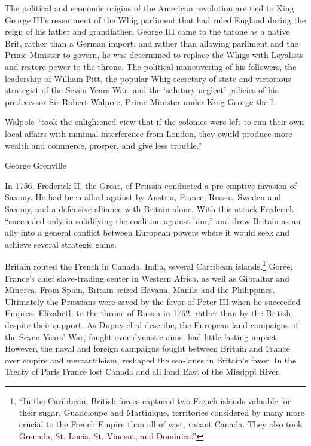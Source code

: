 The political and economic origins of the American revolution are tied to King
George III's resentment of the Whig parliment that had ruled England during the
reign of his father and grandfather. George III came to the throne as a native
Brit, rather than a German import, and rather than allowing parliment and the
Prime Minister to govern, he was determined to replace the Whigs with Loyalists
and restore power to the throne. The political maneuvering of his followers,
the leadership of William Pitt, the popular Whig secretary of state and
victorious strategist of the Seven Years War, and the `salutary
neglect'  policies of his predecessor Sir Robert Walpole, Prime Minister under
King George the I.\cite[Ch 1-4]{cook_long_1995}

Walpole ``took the enlightened view that if the colonies were left to run their
own local affairs with minimal interference from London, they owuld produce more
wealth and commerce, prosper, and give less trouble.''\cite[p. 3]{cook_long_1995}

George Grenville


In 1756, Frederick II, the Great, of Prussia conducted a pre-emptive invasion 
of Saxony. He had been allied against by Austria, France, Russia, Sweden and
Saxony, and a defensive alliance with Britain alone. With this attack Frederick
``succeeded only in solidifying the coalition against
him,''\cite{dupuy_1977} and drew Britain as an ally into a general conflict
between European powers where it would seek and achieve several strategic
gains.

Britain routed the French in Canada, India, several Carribean 
islands,\footnote{``In the Caribbean, British forces captured two French
islands valuable for their sugar, Guadeloupe and Martinique, territories
considered by many more crucial to the French Empire than all of vast, vacant 
Canada. They also took Grenada, St. Lucia, St. Vincent, and 
Dominica.''\cite[8]{dupuy_1977}} Gor\'ee, France's chief slave-trading center
in Western Africa, as well as Gibraltar and Minorca.\cite[7-9]{dupuy_1977}
From Spain, Britain seized Havana, Manila and the Philippines. Ultimately the
Prussians were saved by the favor of Peter III when he succeeded Empress
Elizabeth to the throne of Russia in 1762, rather than by the British, despite
their support. As Dupuy el al describe, the European land campaigns of the
Seven Years' War, fought over dynastic aims, had little lasting impact.
However, the naval and foreign campaigns fought between Britain and France over
empire and mercantileism, reshaped the sea-lanes in Britain's favor. In the
Treaty of Paris France lost Canada and all land East of the Missippi
River.\cite[10]{dupuy_1977}

